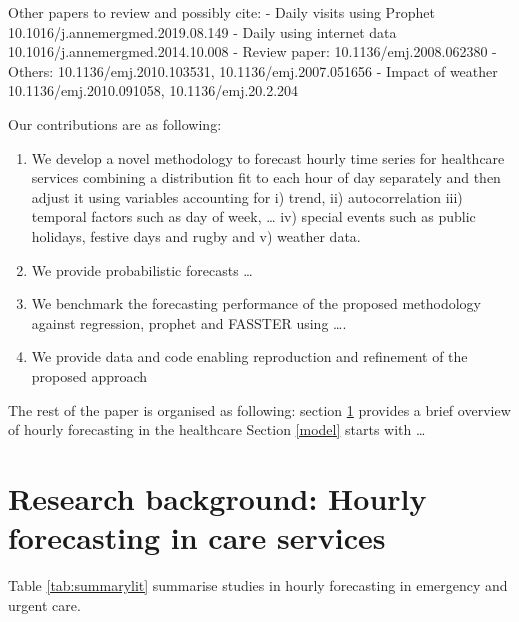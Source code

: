 \documentclass[]{elsarticle} %
\providecommand{\tightlist}{%
  \setlength{\itemsep}{0pt}\setlength{\parskip}{0pt}}
\begin{document}
Other papers to review and possibly cite:
- Daily visits using Prophet 10.1016/j.annemergmed.2019.08.149
- Daily using internet data 10.1016/j.annemergmed.2014.10.008
- Review paper: 10.1136/emj.2008.062380
- Others: 10.1136/emj.2010.103531, 10.1136/emj.2007.051656
- Impact of weather 10.1136/emj.2010.091058, 10.1136/emj.20.2.204

Our contributions are as following:

\begin{enumerate}
\def\labelenumi{\arabic{enumi}.}
\tightlist
\item
  We develop a novel methodology to forecast hourly time series for healthcare services combining a distribution fit to each hour of day separately and then adjust it using variables accounting for i) trend, ii) autocorrelation iii) temporal factors such as day of week, \ldots{} iv) special events such as public holidays, festive days and rugby and v) weather data.
\item
  We provide probabilistic forecasts \ldots{}
\item
  We benchmark the forecasting performance of the proposed methodology against regression, prophet and FASSTER using \ldots.
\item
  We provide data and code enabling reproduction and refinement of the proposed approach
\end{enumerate}

The rest of the paper is organised as following: section \ref{lit} provides a brief overview of hourly forecasting in the healthcare Section \ref{model} starts with \ldots{}

\hypertarget{lit}{%
\section{Research background: Hourly forecasting in care services}\label{lit}}

Table \ref{tab:summarylit} summarise studies in hourly forecasting in emergency and urgent care.
\end{document}
